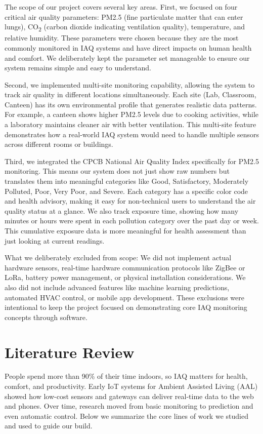 \documentclass[12pt]{report}
\begin{document}
The scope of our project covers several key areas. First, we focused on four critical air quality parameters: PM2.5 (fine particulate matter that can enter lungs), CO\textsubscript{2} (carbon dioxide indicating ventilation quality), temperature, and relative humidity. These parameters were chosen because they are the most commonly monitored in IAQ systems and have direct impacts on human health and comfort. We deliberately kept the parameter set manageable to ensure our system remains simple and easy to understand.

Second, we implemented multi-site monitoring capability, allowing the system to track air quality in different locations simultaneously. Each site (Lab, Classroom, Canteen) has its own environmental profile that generates realistic data patterns. For example, a canteen shows higher PM2.5 levels due to cooking activities, while a laboratory maintains cleaner air with better ventilation. This multi-site feature demonstrates how a real-world IAQ system would need to handle multiple sensors across different rooms or buildings.

Third, we integrated the CPCB National Air Quality Index specifically for PM2.5 monitoring. This means our system does not just show raw numbers but translates them into meaningful categories like Good, Satisfactory, Moderately Polluted, Poor, Very Poor, and Severe. Each category has a specific color code and health advisory, making it easy for non-technical users to understand the air quality status at a glance. We also track exposure time, showing how many minutes or hours were spent in each pollution category over the past day or week. This cumulative exposure data is more meaningful for health assessment than just looking at current readings.

What we deliberately excluded from scope: We did not implement actual hardware sensors, real-time hardware communication protocols like ZigBee or LoRa, battery power management, or physical installation considerations. We also did not include advanced features like machine learning predictions, automated HVAC control, or mobile app development. These exclusions were intentional to keep the project focused on demonstrating core IAQ monitoring concepts through software.

\section{Literature Review}
People spend more than 90\% of their time indoors, so IAQ matters for health, comfort, and productivity. Early IoT systems for Ambient Assisted Living (AAL) showed how low-cost sensors and gateways can deliver real-time data to the web and phones. Over time, research moved from basic monitoring to prediction and even automatic control. Below we summarize the core lines of work we studied and used to guide our build.
\end{document}
